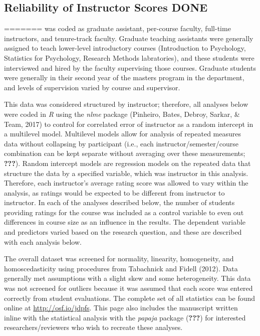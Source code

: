 \documentclass[,man]{apa6}
\theoremstyle{definition}
\theoremstyle{definition}
\theoremstyle{definition}
\theoremstyle{remark}
\begin{document}
\subsection{Reliability of Instructor Scores
DONE}\label{reliability-of-instructor-scores-done}
=======
was coded as graduate assistant, per-course faculty, full-time
instructors, and tenure-track faculty. Graduate teaching assistants were
generally assigned to teach lower-level introductory courses
(Introduction to Psychology, Statistics for Psychology, Research Methods
labratories), and these students were interviewed and hired by the
faculty supervising those courses. Graduate students were generally in
their second year of the masters program in the department, and levels
of supervision varied by course and supervisor.

This data was considered structured by instructor; therefore, all
analyses below were coded in \emph{R} using the \emph{nlme} package
(Pinheiro, Bates, Debroy, Sarkar, \& Team, 2017) to control for
correlated error of instructor as a random intercept in a multilevel
model. Multilevel models allow for analysis of repeated measures data
without collapsing by participant (i.e., each instructor/semester/course
combination can be kept separate without averaging over these
measurements; {\textbf{???}}). Random intercept models are regression
models on the repeated data that structure the data by a specified
variable, which was instructor in this analysis. Therefore, each
instructor's average rating score was allowed to vary within the
analysis, as ratings would be expected to be different from instructor
to instructor. In each of the analyses described below, the number of
students providing ratings for the course was included as a control
variable to even out differences in course size as an influence in the
results. The dependent variable and predictors varied based on the
research question, and these are described with each analysis below.

The overall dataset was screened for normality, linearity, homogeneity,
and homoscedasticity using procedures from Tabachnick and Fidell (2012).
Data generally met assumptions with a slight skew and some
heterogeneity. This data was not screened for outliers because it was
assumed that each score was entered correctly from student evaluations.
The complete set of all statistics can be found online at
\url{http://osf.io/jdpfs}. This page also includes the manuscript
written inline with the statistical analysis with the \emph{papaja}
package ({\textbf{???}}) for interested researchers/reviewers who wish
to recreate these analyses.
\end{document}
